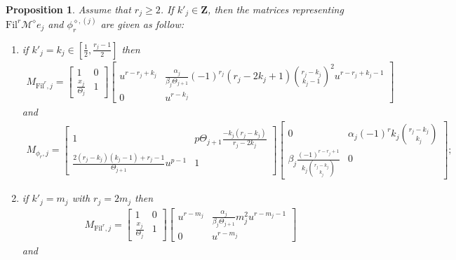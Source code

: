 \documentclass[11pt]{amsart}
\theoremstyle{definition}
\numberwithin{equation}{subsection}
\theoremstyle{plain}
\theoremstyle{plain}
\theoremstyle{plain}
\theoremstyle{plain}
\theoremstyle{plain}
\theoremstyle{plain}
\theoremstyle{plain}
\theoremstyle{plain}
\newtheorem{prop}[equation]{Proposition}
\theoremstyle{plain}
\theoremstyle{plain}
\theoremstyle{plain}
\theoremstyle{plain}
\theoremstyle{definition}
\theoremstyle{definition}
\theoremstyle{definition}
\theoremstyle{remark}
\renewcommand{\(}{\textup{(}}
\renewcommand{\)}{\textup{)}}
\newcommand{\Z}{\mathbf{Z}}
\newcommand{\cM}{\mathcal{M}}
\newcommand{\Fil}{\mathrm{Fil}}
\begin{document}
\begin{prop}\label{prop: mod p reduction, r_j>=2, k'_j integer}
Assume that $r_j\geq 2$. If $k'_j\in \Z$, then the matrices representing $\Fil^r\cM^\diamond e_j$ and $\phi_r^{\diamond,(j)}$ are given as follow:
\begin{enumerate}[leftmargin=*]
\item if $k'_j=k_j\in [\frac{1}{2},\frac{r_j-1}{2}]$ then
    \begin{align*}
    M_{\Fil^r,j}
        =
        \begin{bmatrix}
            1 & 0 \\
            \frac{x_j}{\Theta_j} & 1
        \end{bmatrix}
        \begin{bmatrix}
            u^{r-r_j+k_j} & \frac{\alpha_j}{\beta_j\Theta_{j+1}}(-1)^{r_j}(r_j-2k_j+1)\binom{r_j-k_j}{k_j-1}^2 u^{r-r_j+k_j-1} \\
            0 & u^{r-k_j}
        \end{bmatrix}
    \end{align*}
    and
    \begin{multline*}
    M_{\phi_r,j}
        =
        \begin{bmatrix}
            1 & p\Theta_{j+1}\frac{-k_j(r_j-k_j)}{r_j-2k_j} \\
            \frac{2(r_j-k_j)(k_j-1)+r_j-1}{\Theta_{j+1}}u^{p-1} & 1
        \end{bmatrix}
        \begin{bmatrix}
            0 & \alpha_j (-1)^rk_j\binom{r_j-k_j}{k_j} \\
            \beta_j\frac{(-1)^{r-r_j+1}}{k_j\binom{r_j-k_j}{k_j}} & 0
        \end{bmatrix};
    \end{multline*}
\item if $k'_j=m_j$ with $r_j=2m_j$ then
    \begin{align*}
    M_{\Fil^r,j}
        =
        \begin{bmatrix}
            1 & 0 \\
            \frac{x_j}{\Theta_j} & 1
        \end{bmatrix}
        \begin{bmatrix}
            u^{r-m_j} & \frac{\alpha_j}{\beta_j\Theta_{j+1}} m_j^2 u^{r-m_j-1} \\
            0 & u^{r-m_j}
        \end{bmatrix}
    \end{align*}
    and
    \begin{align*}

\end{align*}
\end{enumerate}
\end{prop}
\end{document}
